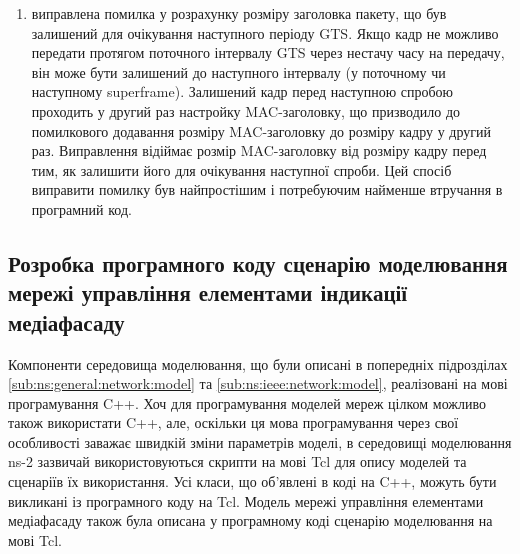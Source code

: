 \documentclass[a4paper,ukrainian,utf8,nocolumnsxix,floatsection,equationsection]{eskdtext}
\begin{document}
\begin{enumerate}
\begin{enumerate}
		\item виправлена помилка у розрахунку розміру заголовка пакету, що був залишений для очікування наступного періоду GTS. Якщо кадр не можливо передати протягом поточного інтервалу GTS через нестачу часу на передачу, він може бути залишений до наступного інтервалу (у поточному чи наступному superframe). Залишений кадр перед наступною спробою проходить у другий раз настройку MAC-заголовку, що призводило до помилкового додавання розміру MAC-заголовку до розміру кадру у другий раз. Виправлення відіймає розмір MAC-заголовку від розміру кадру перед тим, як залишити його для очікування наступної спроби. Цей спосіб виправити помилку був найпростішим і потребуючим найменше втручання в програмний код.
	\end{enumerate}

\end{enumerate}

\subsection{Розробка програмного коду сценарію моделювання мережі управління елементами індикації медіафасаду}

Компоненти середовища моделювання, що були описані в попередніх підрозділах \ref{sub:ns:general:network:model} та \ref{sub:ns:ieee:network:model}, реалізовані на мові програмування C++. Хоч для програмування моделей мереж цілком можливо також використати C++, але, оскільки ця мова програмування через свої особливості заважає швидкій зміни параметрів моделі, в середовищі моделювання ns-2 зазвичай використовуються скрипти на мові Tcl для опису моделей та сценаріїв їх використання. Усі класи, що об'явлені в коді на C++, можуть бути викликані із програмного коду на Tcl. Модель мережі управління елементами медіафасаду також була описана у програмному коді сценарію моделювання на мові Tcl.
\end{document}
